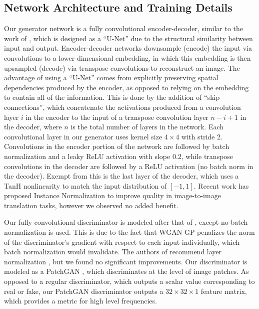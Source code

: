 \subsection{Network Architecture and Training Details}
Our generator network is a fully convolutional encoder-decoder, similar to the work of \cite{isola2016image}, which is
designed as a ``U-Net'' \cite{ronneberger2015u} due to the structural similarity between input and output.
Encoder-decoder networks downsample (encode) the input via convolutions to a lower dimensional embedding, in which
this embedding is then upsampled (decode) via transpose convolutions to reconstruct an image. The advantage of using
a ``U-Net'' comes from explicitly preserving spatial dependencies produced by the encoder, as opposed to relying on the
embedding to contain all of the information. This is done by the addition of ``skip connections'', which concatenate
the activations produced from a convolution layer $i$ in the encoder to the input of a transpose convolution layer
$n-i+1$ in the decoder, where $n$ is the total number of layers in the network. Each convolutional layer in our
generator uses kernel size $4 \times 4$ with stride 2. Convolutions in the encoder portion of the network are followed
by batch normalization \cite{pmlr-v37-ioffe15} and a leaky ReLU activation with slope $0.2$, while transpose
convolutions in the decoder are followed by a ReLU activation \cite{nair2010rectified} (no batch norm in the decoder).
Exempt from this is the last layer of the decoder, which uses a TanH nonlinearity to match the input distribution of
$[-1, 1]$. Recent work has proposed Instance Normalization \cite{ulyanov2016instance} to improve quality
in image-to-image translation tasks, however we observed no added benefit.

Our fully convolutional discriminator is modeled after that of \cite{radford2015unsupervised}, except no batch
normalization is used. This is due to the fact that WGAN-GP penalizes the norm of the discriminator's gradient with
respect to each input individually, which batch normalization would invalidate. The authors of
\cite{gulrajani2017improved} recommend layer normalization \cite{ba2016layer}, but we found no significant improvements.
Our discriminator is modeled as a PatchGAN \cite{isola2016image,li2016precomputed}, which discriminates at the level of
image patches. As opposed to a regular discriminator, which outputs a scalar value corresponding to real or fake, our
PatchGAN discriminator outputs a $32 \times 32 \times 1$ feature matrix, which provides a metric for high level
frequencies. %
